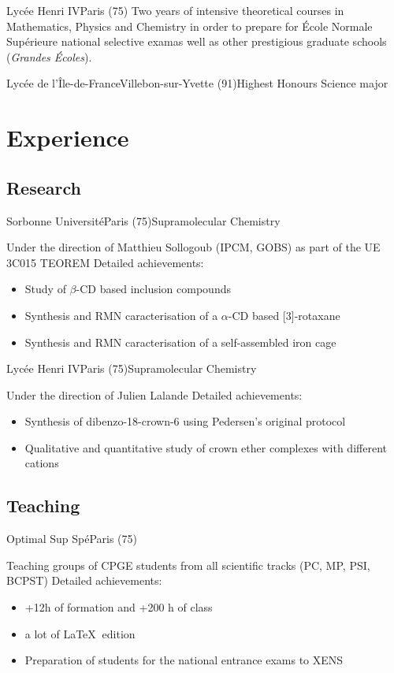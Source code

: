 \documentclass[11pt,a4paper,sans]{moderncv}
\begin{document}
%
{Lycée Henri IV}{Paris (75)}{}%
{Two years of intensive theoretical courses in Mathematics, Physics and Chemistry in order to prepare for École Normale Supérieure national selective examas well as other prestigious graduate schools (\emph{Grandes Écoles}).}

%
{Lycée de l'Île-de-France}{Villebon-sur-Yvette (91)}{Highest Honours}%
{Science major}
%

{\newpage}

\section{Experience}
%

\subsection{Research}

%
{Sorbonne Université}{Paris (75)}{Supramolecular Chemistry}%
{Under the direction of Matthieu Sollogoub (IPCM, GOBS) as part of the UE 3C015 TEOREM\newline{}%
Detailed achievements:%
\begin{itemize}%
\item Study of $\beta$-CD based inclusion compounds
\item Synthesis and RMN caracterisation of a $\alpha$-CD based [3]-rotaxane
\item Synthesis and RMN caracterisation of a self-assembled iron cage
\end{itemize}
}

%
{Lycée Henri IV}{Paris (75)}{Supramolecular Chemistry}%
{Under the direction of Julien Lalande \newline{}%
Detailed achievements:%
\begin{itemize}%
\item Synthesis of dibenzo-18-crown-6 using Pedersen's original protocol
\item Qualitative and quantitative study of crown ether complexes with different cations
\end{itemize}
}


\subsection{Teaching}
%
{Optimal Sup Spé}{Paris (75)}{}%
{Teaching groups of CPGE students from all scientific tracks (PC, MP, PSI, BCPST)\newline{}%
Detailed achievements:%
\begin{itemize}%
\item +12h of formation and +200 h of class
\item a lot of {\LaTeX} $~$edition
\item Preparation of students for the national entrance exams to XENS
\end{itemize}
}
\end{document}
